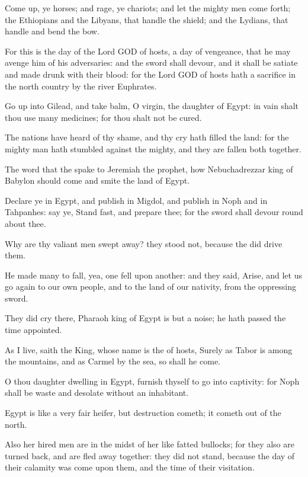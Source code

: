\Verse Come up, ye horses; and rage, ye chariots; and let the mighty men come forth; the Ethiopians and the Libyans, that handle the shield; and the Lydians, that handle and bend the bow.

\Verse For this is the day of the Lord GOD of hosts, a day of vengeance, that he may avenge him of his adversaries: and the sword shall devour, and it shall be satiate and made drunk with their blood: for the Lord GOD of hosts hath a sacrifice in the north country by the river Euphrates.

\Verse Go up into Gilead, and take balm, O virgin, the daughter of Egypt: in vain shalt thou use many medicines; for thou shalt not be cured.

\Verse The nations have heard of thy shame, and thy cry hath filled the land: for the mighty man hath stumbled against the mighty, and they are fallen both together.

\Verse The word that the \LORD spake to Jeremiah the prophet, how Nebuchadrezzar king of Babylon should come and smite the land of Egypt.

\Verse Declare ye in Egypt, and publish in Migdol, and publish in Noph and in Tahpanhes: say ye, Stand fast, and prepare thee; for the sword shall devour round about thee.

\Verse Why are thy valiant men swept away? they stood not, because the \LORD did drive them.

\Verse He made many to fall, yea, one fell upon another: and they said, Arise, and let us go again to our own people, and to the land of our nativity, from the oppressing sword.

\Verse They did cry there, Pharaoh king of Egypt is but a noise; he hath passed the time appointed.

\Verse As I live, saith the King, whose name is the \LORD of hosts, Surely as Tabor is among the mountains, and as Carmel by the sea, so shall he come.

\Verse O thou daughter dwelling in Egypt, furnish thyself to go into captivity: for Noph shall be waste and desolate without an inhabitant.

\Verse Egypt is like a very fair heifer, but destruction cometh; it cometh out of the north.

\Verse Also her hired men are in the midst of her like fatted bullocks; for they also are turned back, and are fled away together: they did not stand, because the day of their calamity was come upon them, and the time of their visitation.

